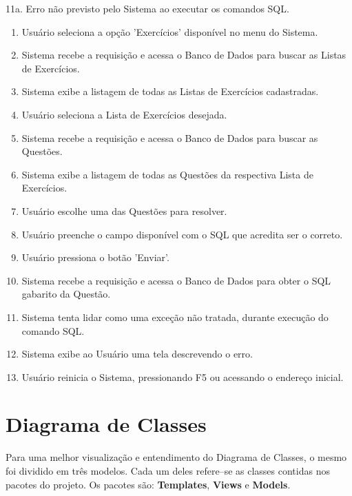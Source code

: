 \documentclass[graduacao,brazil]{ThesisPUC}
\begin{document}
11a. Erro n\~{a}o previsto pelo Sistema ao executar os comandos SQL.

\begin{enumerate}
  \item Usu\'{a}rio seleciona a opção 'Exerc\'{i}cios' dispon\'{i}vel no menu do Sistema.
  \item Sistema recebe a requisi\c{c}\~{a}o e acessa o Banco de Dados para buscar as Listas de Exerc\'{i}cios.
  \item Sistema exibe a listagem de todas as Listas de Exerc\'{i}cios cadastradas.
  \item Usu\'{a}rio seleciona a Lista de Exerc\'{i}cios desejada.
  \item Sistema recebe a requisi\c{c}\~{a}o e acessa o Banco de Dados para buscar as Quest\~{o}es.
  \item Sistema exibe a listagem de todas as Quest\~{o}es da respectiva Lista de Exerc\'{i}cios.
  \item Usu\'{a}rio escolhe uma das Quest\~{o}es para resolver.
  \item Usu\'{a}rio preenche o campo dispon\'{i}vel com o SQL que acredita ser o correto.
  \item Usu\'{a}rio pressiona o bot\~{a}o 'Enviar'.
  \item Sistema recebe a requisi\c{c}\~{a}o e acessa o Banco de Dados para obter o SQL gabarito da Quest\~{a}o.
  \item Sistema tenta lidar como uma exce\c{c}\~{a}o n\~{a}o tratada, durante execu\c{c}\~{a}o do comando SQL.
  \item Sistema exibe ao Usu\'{a}rio uma tela descrevendo o erro.
  \item Usu\'{a}rio reinicia o Sistema, pressionando F5 ou acessando o endere\c{c}o inicial.
\end{enumerate}


\section{Diagrama de Classes}

Para uma melhor visualiza\c{c}\~{a}o e entendimento do Diagrama de Classes, o mesmo foi
dividido em tr\^{e}s modelos. Cada um deles refere--se as classes contidas nos pacotes do
projeto. Os pacotes s\~{a}o: \textbf{Templates}, \textbf{Views} e \textbf{Models}.
\end{document}
